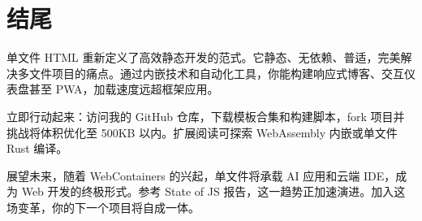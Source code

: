 \chapter{结尾}
单文件 HTML 重新定义了高效静态开发的范式。它静态、无依赖、普适，完美解决多文件项目的痛点。通过内嵌技术和自动化工具，你能构建响应式博客、交互仪表盘甚至 PWA，加载速度远超框架应用。\par
立即行动起来：访问我的 GitHub 仓库，下载模板合集和构建脚本，fork 项目并挑战将体积优化至 500KB 以内。扩展阅读可探索 WebAssembly 内嵌或单文件 Rust 编译。\par
展望未来，随着 WebContainers 的兴起，单文件将承载 AI 应用和云端 IDE，成为 Web 开发的终极形式。参考 State of JS 报告，这一趋势正加速演进。加入这场变革，你的下一个项目将自成一体。\par

